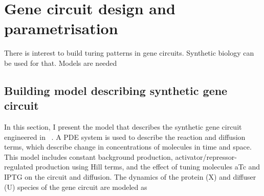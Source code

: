 
\chapter{Gene circuit design and parametrisation}
There is interest to build turing patterns in gene circuits. Synthetic biology can be used for that. Models are needed 
\section{Building model describing synthetic gene circuit}
In this section, I present the model that describes the synthetic gene circuit engineered in ~\cite{Tica2020}.
A PDE system is used to describe the reaction and diffusion terms, which describe change in concentrations of molecules in time and space.
This model includes constant background production, activator/repressor-regulated production using Hill terms, and the effect of tuning molecules aTc and IPTG on the circuit and diffusion.
The dynamics of the protein (X) and diffuser (U) species of the gene circuit are modeled as
%
%
%
%
%
